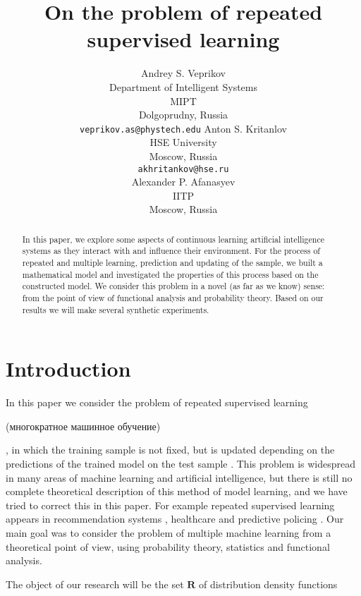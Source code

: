 \documentclass{article}
\title{On the problem of repeated supervised learning}
\author{
    Andrey S. Veprikov\\
	Department of Intelligent Systems\\
	MIPT\\
	Dolgoprudny, Russia \\
	\texttt{veprikov.as@phystech.edu} 
    \And
    Anton S. Kritanlov\\
    HSE University\\
    Moscow, Russia\\
    \texttt{akhritankov@hse.ru}\\
    \And
    Alexander P. Afanasyev \\
    IITP\\
    Moscow, Russia}
\date{}
\begin{document}
\maketitle

\begin{abstract}

    In this paper, we explore some aspects of continuous learning artificial intelligence systems as they interact with and influence their environment. For the process of repeated and multiple learning, prediction and updating of the sample, we built a mathematical model and investigated the properties of this process based on the constructed model. We consider this problem in a novel (as far as we know) sense: from the point of view of functional analysis and probability theory. Based on our results we will make several synthetic experiments.

\end{abstract}



\section{Introduction} \label{Introduction}

    In this paper we consider the problem of repeated supervised learning \begin{otherlanguage}{russian}(многократное машинное обучение)\end{otherlanguage}, in which the training sample is not fixed, but is updated depending on the predictions of the trained model on the test sample \cite{ma2020machine, khritankov2021existence, jiang2019degenerate}. This problem is widespread in many areas of machine learning and artificial intelligence, but there is still no complete theoretical description of this method of model learning, and we have tried to correct this in this paper. For example repeated supervised learning appears in recommendation systems \cite{khritankov2021existence, sinha2016deconvolving}, healthcare \cite{adam2020hidden} and predictive policing \cite{ensign2018runaway}. Our main goal was to consider the problem of multiple machine learning from a theoretical point of view, using probability theory, statistics and functional analysis. 

    The object of our research will be the set $\mathbf{R}$ of distribution density functions
\end{document}
